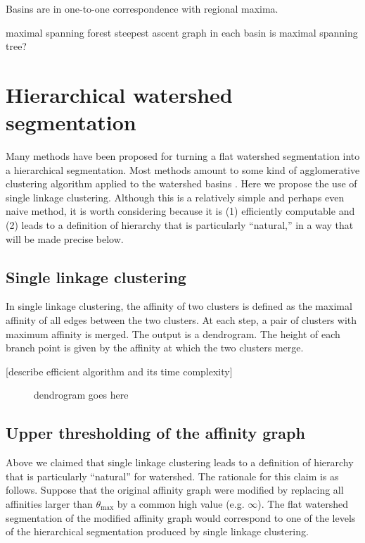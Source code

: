\documentclass{article}
\begin{document}
Basins are in one-to-one correspondence with regional maxima.

maximal spanning forest
steepest ascent graph in each basin is maximal spanning tree?

\section{Hierarchical watershed segmentation}
Many methods have been proposed for turning a flat watershed
segmentation into a hierarchical segmentation.  Most methods amount to
some kind of agglomerative clustering algorithm applied to the
watershed basins \cite{beucher1994watershed, Najman1996}.  Here we
propose the use of single linkage clustering.  Although this is a
relatively simple and perhaps even naive method, it is worth
considering because it is (1) efficiently computable and (2) leads to
a definition of hierarchy that is particularly ``natural,'' in a way
that will be made precise below.

\subsection{Single linkage clustering}
In single linkage clustering, the affinity of two clusters is defined
as the maximal affinity of all edges between the two clusters.  At
each step, a pair of clusters with maximum affinity is merged.  The
output is a dendrogram.  The height of each branch point is given by
the affinity at which the two clusters merge.

[describe efficient algorithm and its time complexity]


\begin{figure}
\caption{dendrogram goes here}
\end{figure}

\subsection{Upper thresholding of the affinity graph}
Above we claimed that single linkage clustering leads to a definition
of hierarchy that is particularly ``natural'' for watershed.  The
rationale for this claim is as follows.  Suppose that the original
affinity graph were modified by replacing all affinities larger than
$\theta_{\max}$ by a common high value (e.g. $\infty$).  The flat watershed
segmentation of the modified affinity graph would correspond to one of
the levels of the hierarchical segmentation produced by single linkage
clustering.
\end{document}

